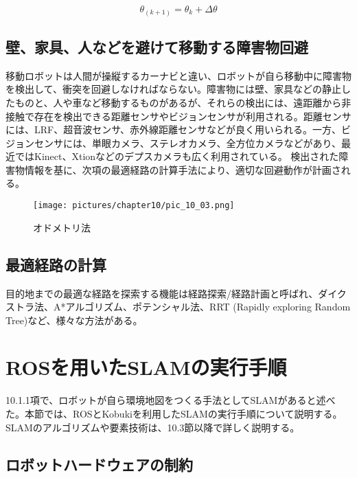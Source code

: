 \begin{equation}
\theta_(k+1)=\theta_k+\Delta\theta
\end{equation}

\subsection{壁、家具、人などを避けて移動する障害物回避}

移動ロボットは人間が操縦するカーナビと違い、ロボットが自ら移動中に障害物を検出して、衝突を回避しなければならない。障害物には壁、家具などの静止したものと、人や車など移動するものがあるが、それらの検出には、遠距離から非接触で存在を検出できる距離センサやビジョンセンサが利用される。距離センサには、LRF、超音波センサ、赤外線距離センサなどが良く用いられる。一方、ビジョンセンサには、単眼カメラ、ステレオカメラ、全方位カメラなどがあり、最近ではKinect、Xtionなどのデプスカメラも広く利用されている。  検出された障害物情報を基に、次項の最適経路の計算手法により、適切な回避動作が計画される。

\begin{figure}[htp]
  \centering
  \texttt{[image: pictures/chapter10/pic\_10\_03.png]}
  \caption{オドメトリ法}
\end{figure}

\subsection{最適経路の計算}

目的地までの最適な経路を探索する機能は経路探索/経路計画と呼ばれ、ダイクストラ法、A*アルゴリズム、ポテンシャル法、RRT (Rapidly exploring Random Tree)など、様々な方法がある。

\section{ROSを用いたSLAMの実行手順}

10.1.1項で、ロボットが自ら環境地図をつくる手法としてSLAMがあると述べた。本節では、ROSとKobukiを利用したSLAMの実行手順について説明する。SLAMのアルゴリズムや要素技術は、10.3節以降で詳しく説明する。

\subsection{ロボットハードウェアの制約}

